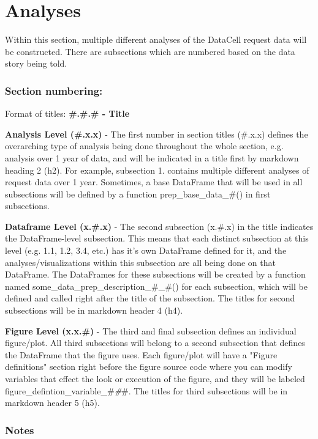 \documentclass[11pt]{article}
\begin{document}
    \section{Analyses}\label{analyses}

    Within this section, multiple different analyses of the DataCell request
data will be constructed. There are subsections which are numbered based
on the data story being told.

\subsubsection{Section numbering:}\label{section-numbering}

Format of titles: \textbf{\#.\#.\# - Title}

\textbf{Analysis Level (\#.x.x)} - The first number in section titles
(\#.x.x) defines the overarching type of analysis being done throughout
the whole section, e.g. analysis over 1 year of data, and will be
indicated in a title first by markdown heading 2 (h2). For example,
subsection 1. contains multiple different analyses of request data over
1 year. Sometimes, a base DataFrame that will be used in all subsections
will be defined by a function prep\_base\_data\_\#() in first
subsections.

\textbf{Dataframe Level (x.\#.x)} - The second subsection (x.\#.x) in
the title indicates the DataFrame-level subsection. This means that each
distinct subsection at this level (e.g. 1.1, 1.2, 3.4, etc.) has it's
own DataFrame defined for it, and the analyses/visualizations within
this subsection are all being done on that DataFrame. The DataFrames for
these subsections will be created by a function named
some\_data\_prep\_description\_\#\_\#() for each subsection, which will
be defined and called right after the title of the subsection. The
titles for second subsections will be in markdown header 4 (h4).

\textbf{Figure Level (x.x.\#)} - The third and final subsection defines
an individual figure/plot. All third subsections will belong to a second
subsection that defines the DataFrame that the figure uses. Each
figure/plot will have a "Figure definitions" section right before the
figure source code where you can modify variables that effect the look
or execution of the figure, and they will be labeled
figure\_defintion\_variable\_\#\emph{\#}\#. The titles for third
subsections will be in markdown header 5 (h5).

\subsubsection{Notes}\label{notes}
\end{document}
